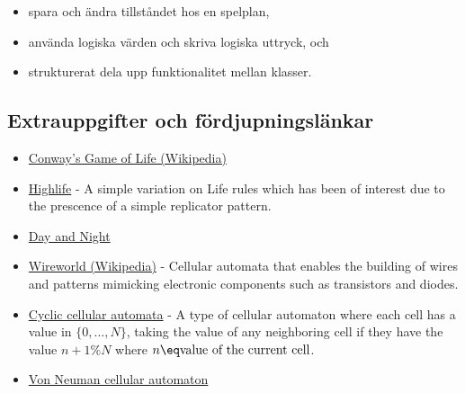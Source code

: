 \begin{Datorarbete}
\begin{itemize}
		\item spara och ändra tillståndet hos en spelplan,
		
		\item använda logiska värden och skriva logiska uttryck, och
		
		\item strukturerat dela upp funktionalitet mellan klasser.
	\end{itemize}

        \subsection{Extrauppgifter och fördjupningslänkar}


        
        \begin{itemize}
                \item \href{https://en.wikipedia.org/wiki/Conway's_Game_of_Life}{Conway's Game of Life (Wikipedia)}
                \item \href{https://en.wikipedia.org/wiki/Highlife_(cellular_automaton)}{Highlife} - A simple variation on Life rules which has been of interest due to the prescence of a simple replicator pattern.
        \end{itemize}
        
        \begin{itemize}
                \item \href{https://en.wikipedia.org/wiki/Day_and_Night_(cellular_automaton)}{Day and Night}
                \item \href{https://en.wikipedia.org/wiki/Wireworld}{Wireworld (Wikipedia)} - Cellular automata that enables the building of wires and patterns mimicking electronic components such as transistors and diodes.
                \item \href{https://en.wikipedia.org/wiki/Cyclic cellular automata}{Cyclic cellular automata} - A type of cellular automaton where each cell has a value in $\{0, \dots, N\}$, taking the value of any neighboring cell if they have the value $n+1 \% N$ where $n \eq \text{value of the current cell}$.
                \item \href{https://en.wikipedia.org/wiki/Von_Neumann_cellular_automaton}{Von Neuman cellular automaton}
        \end{itemize}


\end{Datorarbete}
